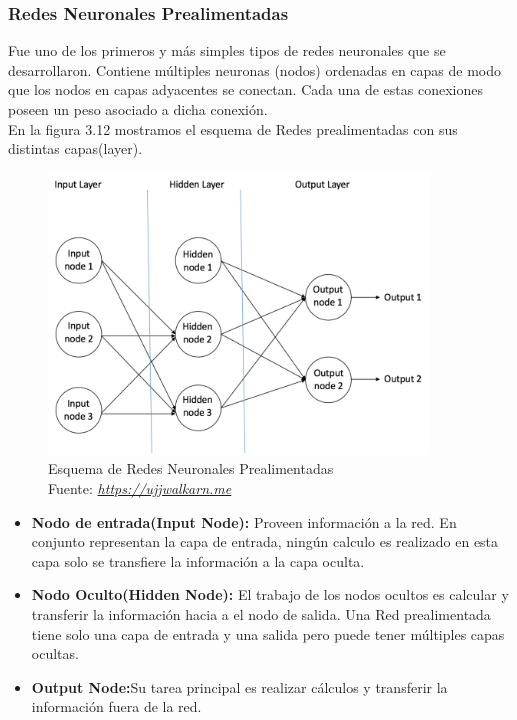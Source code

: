 \subsubsection{Redes Neuronales Prealimentadas}
Fue uno de los primeros y más simples tipos de redes neuronales que se desarrollaron. Contiene múltiples neuronas (nodos) ordenadas en capas de modo que los nodos en capas adyacentes se conectan. Cada una de estas conexiones poseen un peso asociado a dicha conexión.\\
En la figura 3.12 mostramos el esquema de Redes prealimentadas con sus distintas capas(layer).
\begin{figure}[H]
	\centering
	\includegraphics[width=0.9\textwidth]{Figures/esquemaff.png}
	\caption{Esquema de Redes Neuronales Prealimentadas \\ Fuente:  \href{https://ujjwalkarn.me/2016/08/09/quick-intro-neural-networks/}{\textit{https://ujjwalkarn.me}}}
	\label{neuronasredes}
\end{figure} 
\begin{itemize}
	\item \textbf{Nodo de entrada(Input Node):} Proveen información a la red. En conjunto representan la capa de entrada, ningún calculo es realizado en esta capa solo se transfiere la información a la capa oculta.
	\item \textbf{Nodo Oculto(Hidden Node):} El trabajo de los nodos ocultos es calcular y transferir la información hacia a el nodo de salida. Una Red prealimentada tiene solo una capa de entrada y una salida pero puede tener múltiples capas ocultas.
	\item \textbf{Output Node:}Su tarea principal es realizar cálculos y transferir la información fuera de la red.
\end{itemize}
